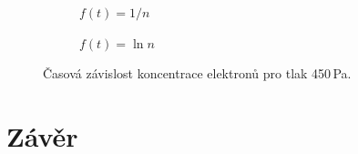 \documentclass[a4paper,12pt]{article}
\begin{document}
\begin{figure}[h]
	\centering
	\begin{subfigure}[b]{.49\linewidth}
		\centering
		\caption{$f(t) = 1/n$}
	\end{subfigure}
	\begin{subfigure}[b]{.49\linewidth}
		\centering
		\caption{$f(t) = \ln n$}
	\end{subfigure}
	\caption{Časová závislost koncentrace elektronů pro tlak 450\,Pa.}
	\label{g:450Pa}
\end{figure}

\newpage
\section{Závěr}
\end{document}
